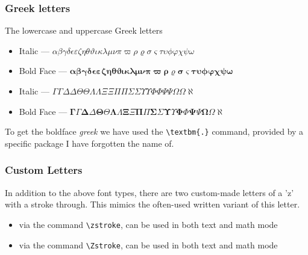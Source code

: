 \documentclass[../thesis.tex]{subfiles}
\begin{document}
\subsubsection{Greek letters}
The lowercase and uppercase Greek letters
\begin{itemize}
    \item {Italic —} $\alpha \beta \gamma \delta \epsilon \varepsilon \zeta \eta \theta \vartheta \iota \kappa \lambda \mu \nu \pi \varpi \rho \varrho \sigma \varsigma \tau \upsilon \phi \varphi \chi \psi \omega $
    \item {Bold Face —} $\bm{\alpha \beta \gamma \delta \epsilon \varepsilon \zeta \eta \theta \vartheta \iota \kappa \lambda \mu \nu \pi \varpi \rho \varrho \sigma \varsigma \tau \upsilon \phi \varphi \chi \psi \omega}$
    \item {Italic} — $\Gamma \varGamma \Delta \varDelta \Theta \varTheta \Lambda \varLambda \Xi \varXi \Pi \varPi \Sigma \varSigma \Upsilon \varUpsilon \Phi \varPhi \Psi \varPsi \Omega \varOmega \aleph$
    \item {Bold Face} — $\bm{\Gamma \varGamma \Delta \varDelta \Theta \varTheta \Lambda \varLambda \Xi \varXi \Pi \varPi \Sigma \varSigma \Upsilon \varUpsilon \Phi \varPhi \Psi \varPsi \Omega \varOmega \aleph}$
\end{itemize}
To get the boldface \emph{greek} we have used the \verb|\textbm{.}| command, provided by a specific package I have forgotten the name of.

\subsubsection{Custom Letters}
In addition to the above font types, there are two custom-made letters of a 'z' with a stroke through. This mimics the often-used written variant of this letter.
\begin{itemize}
    \item {\zstroke}  via the command \verb|\zstroke|, can be used in both text and math mode
    \item {\Zstroke}  via the command \verb|\Zstroke|, can be used in both text and math mode 
\end{itemize}
\end{document}
